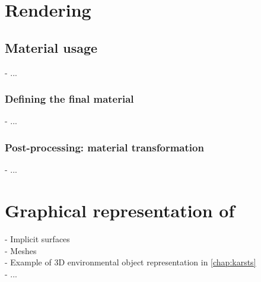 \section{Rendering}

\subsection{Material usage}
- ...

\subsubsection{Defining the final material}
- ...

\subsubsection{Post-processing: material transformation}
- ...

\section{Graphical representation of }
\label{sec:volumic-modeling_graphic-representation-env-objects}
- Implicit surfaces \\
- Meshes \\
- Example of 3D environmental object representation in \cref{chap:karsts} \\
- ...
